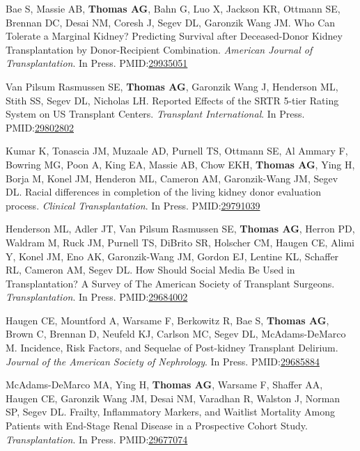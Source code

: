 \documentclass[10pt]{article}
\makeatletter
\newlength{\bibhang}
\newlength{\bibsep}
 {\@listi \global\bibsep\itemsep \global\advance\bibsep by\parsep}
\newenvironment{bibenum*}
  {\renewcommand\labelenumi{[\theenumi]}%
   \etaremune[
     topsep=0pt,
     itemsep=\bibsep,
     parsep=0pt,partopsep=0pt,
     itemindent=-\bibhang,
     leftmargin={\bibhang+\widthof{[999]}}]}
  {\endetaremune}
\newcommand{\pmid}[1]{PMID:\href{https://www.ncbi.nlm.nih.gov/pubmed/#1}{#1}}
\makeatother
\begin{document}
\begin{bibenum*}
\item Bae S, Massie AB, \textbf{Thomas AG}, Bahn G, Luo X, Jackson KR,
  Ottmann SE, Brennan DC, Desai NM, Coresh J, Segev DL, Garonzik Wang JM.
  Who Can Tolerate a Marginal Kidney? Predicting Survival after
  Deceased-Donor Kidney Transplantation by Donor-Recipient Combination.
  \emph{American Journal of Transplantation}. In Press.
  \pmid{29935051} 

\item Van Pilsum Rasmussen SE, \textbf{Thomas AG}, Garonzik Wang J,
  Henderson ML, Stith SS, Segev DL, Nicholas LH. Reported Effects
  of the SRTR 5-tier Rating System on US Transplant Centers.
  \emph{Transplant International}. In Press.
  \pmid{29802802} 

\item Kumar K, Tonascia JM, Muzaale AD, Purnell TS, Ottmann SE,
  Al Ammary F, Bowring MG, Poon A, King EA, Massie AB, Chow EKH,
  \textbf{Thomas AG}, Ying H, Borja M, Konel JM, Henderon ML,
  Cameron AM, Garonzik-Wang JM, Segev DL. Racial differences in
  completion of the living kidney donor evaluation process.
  \emph{Clinical Transplantation}. In Press.
  \pmid{29791039} 

\item Henderson ML, Adler JT, Van Pilsum Rasmussen SE, \textbf{Thomas AG},
  Herron PD, Waldram M, Ruck JM, Purnell TS, DiBrito SR, Holscher CM,
  Haugen CE, Alimi Y, Konel JM, Eno AK, Garonzik-Wang JM, Gordon EJ,
  Lentine KL, Schaffer RL, Cameron AM, Segev DL.
  How Should Social Media Be Used in Transplantation?
  A Survey of The American Society of Transplant Surgeons.
  \emph{Transplantation}. In Press.
  \pmid{29684002} 

\item Haugen CE, Mountford A, Warsame F, Berkowitz R, Bae S,
  \textbf{Thomas AG}, Brown C, Brennan D, Neufeld KJ, Carlson MC,
  Segev DL, McAdams-DeMarco M.
  Incidence, Risk Factors, and Sequelae of Post-kidney Transplant Delirium.
  \emph{Journal of the American Society of Nephrology}. In Press.
  \pmid{29685884} 

\item McAdams-DeMarco MA, Ying H, \textbf{Thomas AG}, Warsame F,
  Shaffer AA, Haugen CE, Garonzik Wang JM, Desai NM, Varadhan R,
  Walston J, Norman SP, Segev DL. Frailty, Inflammatory Markers, and
  Waitlist Mortality Among Patients with End-Stage Renal Disease in a
  Prospective Cohort Study.
  \emph{Transplantation}. In Press.
  \pmid{29677074} 


\end{bibenum*}
\end{document}
